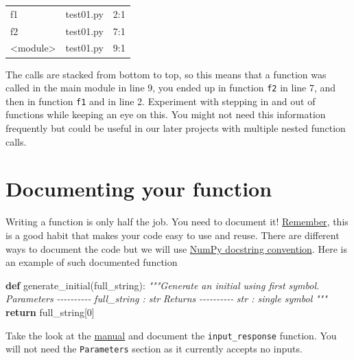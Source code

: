 \documentclass[
]{book}
\newenvironment{Shaded}{\begin{snugshade}}{\end{snugshade}}
\newcommand{\CommentTok}[1]{\textcolor[rgb]{0.56,0.35,0.01}{\textit{#1}}}
\newcommand{\ControlFlowTok}[1]{\textcolor[rgb]{0.13,0.29,0.53}{\textbf{#1}}}
\newcommand{\DecValTok}[1]{\textcolor[rgb]{0.00,0.00,0.81}{#1}}
\newcommand{\KeywordTok}[1]{\textcolor[rgb]{0.13,0.29,0.53}{\textbf{#1}}}
\newcommand{\NormalTok}[1]{#1}
\begin{document}
\begin{longtable}[]{@{}lll@{}}
\toprule\noalign{}
\endhead
\bottomrule\noalign{}
\endlastfoot
f1 & test01.py & 2:1 \\
f2 & test01.py & 7:1 \\
\textless module\textgreater{} & test01.py & 9:1 \\
\end{longtable}

The calls are stacked from bottom to top, so this means that a function was called in the main module in line 9, you ended up in function \texttt{f2} in line 7, and then in function \texttt{f1} and in line 2. Experiment with stepping in and out of functions while keeping an eye on this. You might not need this information frequently but could be useful in our later projects with multiple nested function calls.

\hypertarget{numpy-docstring}{%
\section{Documenting your function}\label{numpy-docstring}}

Writing a function is only half the job. You need to document it! \protect\hyperlink{programming-tips}{Remember}, this is a good habit that makes your code easy to use and reuse. There are different ways to document the code but we will use \href{https://numpydoc.readthedocs.io/en/latest/format.html\#docstring-standard}{NumPy docstring convention}. Here is an example of such documented function

\begin{Shaded}
\begin{Highlighting}[]
\KeywordTok{def}\NormalTok{ generate\_initial(full\_string):}
    \CommentTok{"""Generate an initial using first symbol.}
\CommentTok{    }
\CommentTok{    Parameters}
\CommentTok{    {-}{-}{-}{-}{-}{-}{-}{-}{-}{-}}
\CommentTok{    full\_string : str}
\CommentTok{    }
\CommentTok{    Returns}
\CommentTok{    {-}{-}{-}{-}{-}{-}{-}{-}{-}{-}}
\CommentTok{    str : single symbol}
\CommentTok{    """}
    \ControlFlowTok{return}\NormalTok{ full\_string[}\DecValTok{0}\NormalTok{]}
\end{Highlighting}
\end{Shaded}

Take the look at the \href{https://numpydoc.readthedocs.io/en/latest/format.html\#docstring-standard}{manual} and document the \texttt{input\_response} function. You will not need the \texttt{Parameters} section as it currently accepts no inputs.
\end{document}
